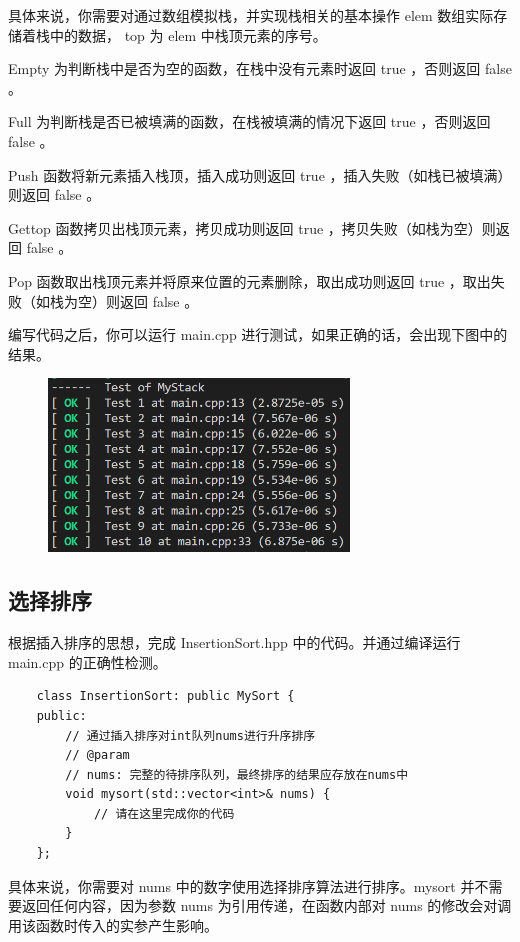 \documentclass{article}
\begin{document}
具体来说，你需要对通过数组模拟栈，并实现栈相关的基本操作 elem 数组实际存储着栈中的数据， top 为 elem 中栈顶元素的序号。

Empty 为判断栈中是否为空的函数，在栈中没有元素时返回 true ，否则返回 false 。

Full 为判断栈是否已被填满的函数，在栈被填满的情况下返回 true ，否则返回 false 。

Push 函数将新元素插入栈顶，插入成功则返回 true ，插入失败（如栈已被填满）则返回 false 。

Gettop 函数拷贝出栈顶元素，拷贝成功则返回 true ，拷贝失败（如栈为空）则返回 false 。

Pop 函数取出栈顶元素并将原来位置的元素删除，取出成功则返回 true ，取出失败（如栈为空）则返回 false 。

编写代码之后，你可以运行 main.cpp 进行测试，如果正确的话，会出现下图中的结果。


\begin{figure}[h]
\centering
\includegraphics[width=8cm]{img/lab1/insertionsort.png}
\end{figure}

\subsection{选择排序}

根据插入排序的思想，完成 InsertionSort.hpp 中的代码。并通过编译运行 main.cpp 的正确性检测。

\begin{lstlisting}
    class InsertionSort: public MySort {
    public:
        // 通过插入排序对int队列nums进行升序排序
        // @param
        // nums: 完整的待排序队列，最终排序的结果应存放在nums中
        void mysort(std::vector<int>& nums) {
            // 请在这里完成你的代码
        }
    };
\end{lstlisting}

具体来说，你需要对 nums 中的数字使用选择排序算法进行排序。mysort 并不需要返回任何内容，因为参数 nums 为引用传递，在函数内部对 nums 的修改会对调用该函数时传入的实参产生影响。
\end{document}
